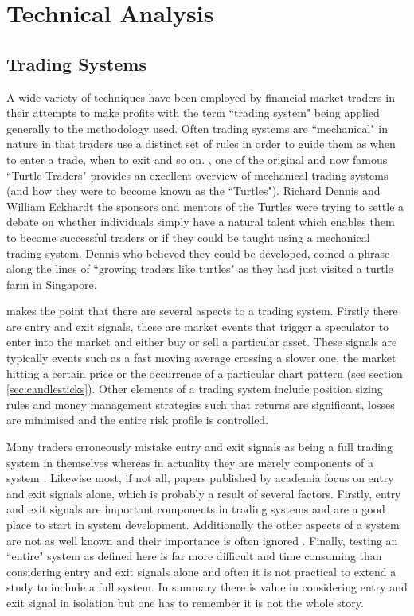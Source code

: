 \section{Technical Analysis}

\subsection{Trading Systems}
\label{sec:tradingsystems}
A wide variety of techniques have been employed by financial market traders in their attempts to make profits with the term \textquotedblleft trading system" being applied generally to the methodology used. Often trading systems are \textquotedblleft mechanical" in nature in that traders use a distinct set of rules in order to guide them as when to enter a trade, when to exit and so on. \cite{faith2007way}, one of the original and now famous \textquotedblleft Turtle Traders" provides an excellent overview of mechanical trading systems (and how they were to become known as the \textquotedblleft Turtles"). Richard Dennis and William Eckhardt the sponsors and mentors of the Turtles were trying to settle a debate on whether individuals simply have a natural talent which enables them to become successful traders or if they could be taught using a mechanical trading system. Dennis who believed they could be developed, coined a phrase along the lines of \textquotedblleft growing traders like turtles" as they had just visited a turtle farm in Singapore.

\cite{weissman2005mechanical} makes the point that there are several aspects to a trading system. Firstly there are entry and exit signals, these are market events that trigger a speculator to enter into the market and either buy or sell a particular asset. These signals are typically events such as a fast moving average crossing a slower one, the market hitting a certain price or the occurrence of a particular chart pattern (see section \ref{sec:candlesticks}). Other elements of a trading system include position sizing rules and money management strategies such that returns are significant, losses are minimised and the entire risk profile is controlled.

Many traders erroneously mistake entry and exit signals as being a full trading system in themselves whereas in actuality they are merely components of a system \citep{beau1999day}. Likewise most, if not all, papers published by academia focus on entry and exit signals alone, which is probably a result of several factors. Firstly, entry and exit signals are important components in  trading systems and are a good place to start in system development. Additionally the other aspects of a system are not as well known and their importance is often ignored \citep{kaufman2013trading}. Finally, testing an \textquotedblleft entire" system as defined here is far more difficult and time consuming than considering entry and exit signals alone and often it is not practical to extend a study to include a full system. In summary there is value in considering entry and exit signal in isolation but one has to remember it is not the whole story.

